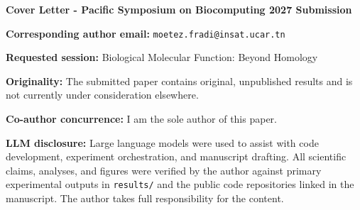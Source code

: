 \thispagestyle{empty}
\vspace*{0.5in}
{\large\bfseries Cover Letter - Pacific Symposium on Biocomputing 2027 Submission\par}
\vspace{0.3in}

\noindent\textbf{Corresponding author email:} \texttt{moetez.fradi@insat.ucar.tn}

\vspace{0.15in}
\noindent\textbf{Requested session:} Biological Molecular Function: Beyond Homology

\vspace{0.15in}
\noindent\textbf{Originality:} The submitted paper contains original, unpublished results and is not currently under consideration elsewhere.

\vspace{0.15in}
\noindent\textbf{Co-author concurrence:} I am the sole author of this paper.

\vspace{0.15in}
\noindent\textbf{LLM disclosure:} Large language models were used to assist with code development, experiment orchestration, and manuscript drafting. All scientific claims, analyses, and figures were verified by the author against primary experimental outputs in \texttt{results/} and the public code repositories linked in the manuscript. The author takes full responsibility for the content.

\vfill

\newpage
